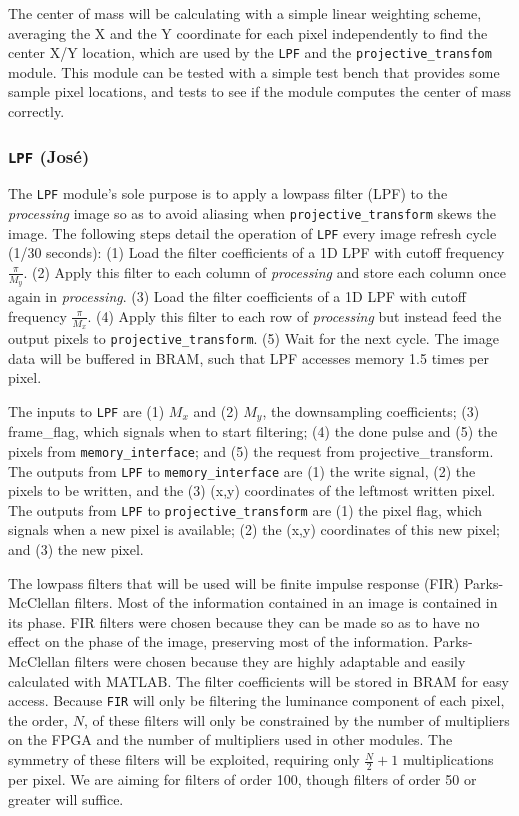 \documentclass[10pt]{article}
\begin{document}
The center of mass will be calculating with a simple linear weighting scheme, averaging the X and the Y coordinate for each pixel independently to find the center X/Y location, which are used by the {\tt LPF} and the {\tt projective\_transfom} module. This module can be tested with a simple test bench that provides some sample pixel locations, and tests to see if the module computes the center of mass correctly.

\subsubsection{{\tt LPF} (Jos\'{e})}
The {\tt LPF} module's sole purpose is to apply a lowpass filter (LPF) to the {\it processing} image so as to avoid aliasing when {\tt projective\_transform} skews the image. The following steps detail the operation of {\tt LPF} every image refresh cycle (1/30 seconds): (1) Load the filter coefficients of a 1D LPF with cutoff frequency \( \frac{\pi}{M_y} \). (2) Apply this filter to each column of {\it processing} and store each column once again in {\it processing}. (3) Load the filter coefficients of a 1D LPF with cutoff frequency \( \frac{\pi}{M_x} \). (4) Apply this filter to each row of {\it processing} but instead feed the output pixels to {\tt projective\_transform}. (5) Wait for the next cycle. The image data will be buffered in BRAM, such that LPF accesses memory 1.5 times per pixel.

The inputs to {\tt LPF} are (1) \( M_x \) and (2) \( M_y \), the downsampling coefficients; (3) frame\_flag, which signals when to start filtering; (4) the done pulse and (5) the pixels from {\tt memory\_interface}; and (5) the request from {projective\_transform}. The outputs from {\tt LPF} to {\tt memory\_interface} are (1) the write signal, (2) the pixels to be written, and the (3) (x,y) coordinates of the leftmost written pixel. The outputs from {\tt LPF} to {\tt projective\_transform} are (1) the pixel flag, which signals when a new pixel is available; (2) the (x,y) coordinates of this new pixel; and (3) the new pixel.

The lowpass filters that will be used will be finite impulse response (FIR) Parks-McClellan filters. Most of the information contained in an image is contained in its phase. FIR filters were chosen because they can be made so as to have no effect on the phase of the image, preserving most of the information. Parks-McClellan filters were chosen because they are highly adaptable and easily calculated with MATLAB. The filter coefficients will be stored in BRAM for easy access. Because {\tt FIR} will only be filtering the luminance component of each pixel, the order, \( N \), of these filters will only be constrained by the number of multipliers on the FPGA and the number of multipliers used in other modules. The symmetry of these filters will be exploited, requiring only \( \frac{N}{2}+1 \) multiplications per pixel. We are aiming for filters of order 100, though filters of order 50 or greater will suffice.
\end{document}
